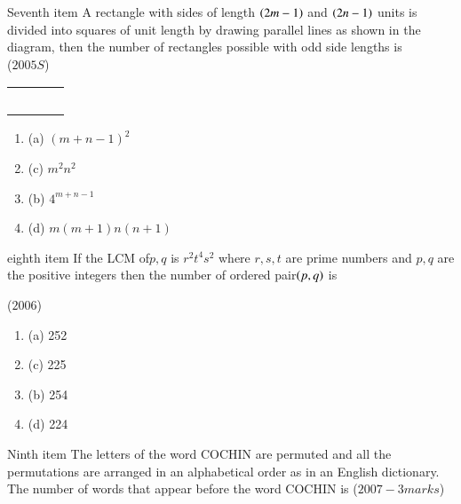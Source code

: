 \documentclass[journal,12pt,twocolumn]{IEEEtran}
\theoremstyle{remark}
\begin{document}
\begin{enumerate}[start=3]
\item Seventh item A rectangle with sides of length $\left(2m-1\right)$ and $\left(2n-1\right)$ units is divided into squares of unit length by drawing parallel lines as shown in the diagram, then the number of rectangles possible with odd side lengths is\\
\hfill{($2005S$)}\\
\begin{center}
\begin{tabular}{|c|c|c|c|}
\hline
\quad&\quad&\quad&\quad\\
\hline
\quad&\quad&\quad&\quad\\
\hline
\quad&\quad&\quad&\quad\\
\hline\quad&\quad&\quad&\quad\\
\hline\quad&\quad&\quad&\quad\\
\hline\quad&\quad&\quad&\quad\\
\hline
\end{tabular}
\end{center}
\begin{multicols}{2} 
\begin{enumerate}
[label=, left=0pt, labelsep=0pt, itemsep=1em]
\item (a) $(m+n-1)^2$
\item (c) $m^2n^2$\item (b) $4^{m+n-1}$\item(d) $m(m+1)n(n+1)$
\end{enumerate}
\end{multicols}
\item eighth item If the LCM of$p,q$ is $r^2t^4s^2$ where $r,s,t$ are prime numbers and $p,q$ are the positive integers then the number of ordered pair$\left(p,q\right)$ is \hfill{($2006$)\\
\begin{multicols}{2} 
\begin{enumerate}
[label=, left=0pt, labelsep=0pt, itemsep=1em]
\item (a) 252\item  (c) 225
\item (b) 254\item (d) 224
\end{enumerate}
\end{multicols}
\item Ninth item The letters of the word COCHIN are permuted and all the permutations are arranged in an alphabetical order as in an English dictionary. The number of words that appear before the word COCHIN is
\hfill{($2007-3 marks$)}\\
}
\end{enumerate}
\end{document}
